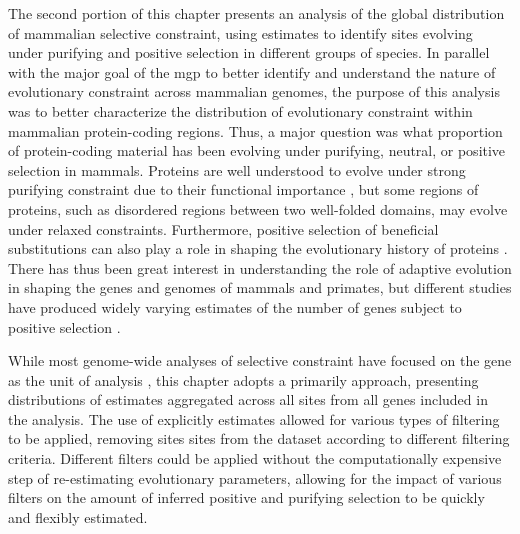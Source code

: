 The second portion of this chapter presents an analysis of the global
distribution of mammalian selective constraint, using \sw estimates to
identify sites evolving under purifying and positive selection in
different groups of species. In parallel with the major goal of the
\ac{mgp} to better identify and understand the nature of evolutionary
constraint across mammalian genomes, the purpose of this analysis was
to better characterize the distribution of evolutionary constraint
within mammalian protein-coding regions. Thus, a major question was
what proportion of protein-coding material has been evolving under
purifying, neutral, or positive selection in mammals. Proteins are
well understood to evolve under strong purifying constraint due to
their functional importance \citep{Fay2003}, but some regions of
proteins, such as disordered regions between two well-folded domains,
may evolve under relaxed constraints. Furthermore, positive selection
of beneficial substitutions can also play a role in shaping the
evolutionary history of proteins \citep{Pal2006}. There has thus been
great interest in understanding the role of adaptive evolution in
shaping the genes and genomes of mammals and primates, but different
studies have produced widely varying estimates of the number of genes
subject to positive selection \citep{Ellegren2008,MarquesBonet2009a}.

While most genome-wide analyses of selective constraint have focused
on the gene as the unit of analysis
\citep{Nielsen2005,Sequencing2005a,Kosiol2008}, this chapter adopts a
primarily \sw approach, presenting distributions of \sw estimates
aggregated across all sites from all genes included in the
analysis. The use of explicitly \sw estimates allowed for various
types of filtering to be applied, removing sites sites from the
dataset according to different filtering criteria. Different \sw
filters could be applied without the computationally expensive step of
re-estimating evolutionary parameters, allowing for the impact of
various filters on the amount of inferred positive and purifying
selection to be quickly and flexibly estimated.


